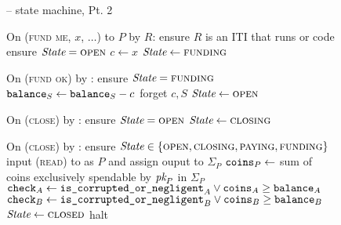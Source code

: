 \begin{figure}[H]
  \begin{systembox}{\fchan{} -- state machine, Pt. 2}
    \begin{algorithmic}[1]
      \State On (\textsc{fund me}, $x$, $\dots$) to $P$ by $R$:
      \Indent
        \State ensure $R$ is an ITI that runs \fchan or \pchan code
        \State ensure $\itistate = \textsc{open}$
        \State $c \gets x$
        \State $\itistate \gets \textsc{funding}$
      \EndIndent
      \Statex

      \State On (\textsc{fund ok}) by \adversary:
      \Indent
        \State ensure $\itistate = \textsc{funding}$
        \State $\texttt{balance}_{S} \gets \texttt{balance}_{S} - c$
        \State forget $c, S$
        \State $\itistate \gets \textsc{open}$
      \EndIndent
      \Statex

      \State On (\textsc{close}) by \environment:
      \Indent
        \State ensure $\itistate = \textsc{open}$
        \State $\itistate \gets \textsc{closing}$
      \EndIndent
      \Statex

      \State On (\textsc{close}) by \adversary:
      \Indent
        \State ensure $\itistate \in \{\textsc{open}, \textsc{closing},
        \textsc{paying}, \textsc{funding}\}$
        \label{code:functionality:state-machine-2:close:ensure}
            \State input (\textsc{read}) to \ledger as $P$ and assign ouput to
            $\Sigma_P$
            \State $\texttt{coins}_{P} \gets$ sum of coins exclusively spendable by
            $\textit{pk}_{P}$ in $\Sigma_P$
            \label{code:functionality:state-machine-2:close:coins}
          \EndIf
        \EndFor
        \State $\texttt{check}_A \gets \texttt{is\_corrupted\_or\_negligent}_A
        \vee \texttt{coins}_{A} \geq \texttt{balance}_{A}$
        \State $\texttt{check}_B \gets \texttt{is\_corrupted\_or\_negligent}_B
        \vee \texttt{coins}_{B} \geq \texttt{balance}_{B}$
          \State $\itistate \gets \textsc{closed}$
        \Else \: 
          \State halt
          \label{code:functionality:state-machine-2:halt}
        \EndIf
      \EndIndent
    \end{algorithmic}
  \end{systembox}
  \caption{}
  \label{code:functionality:state-machine-2}
\end{figure}
